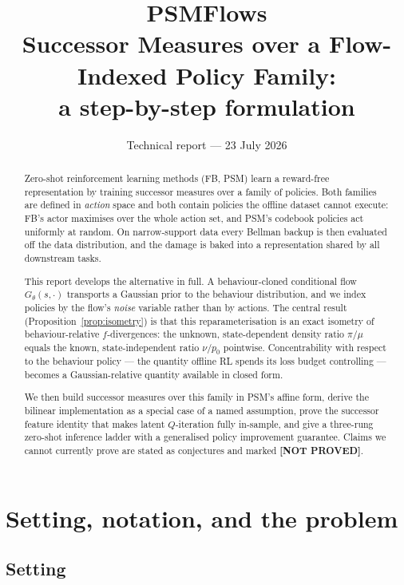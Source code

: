 \documentclass[11pt]{article}
\title{\textbf{PSMFlows}\\[0.3em]
\large Successor Measures over a Flow-Indexed Policy Family:\\
a step-by-step formulation}
\author{}
\date{Technical report --- 23 July 2026}
\theoremstyle{plain}
\theoremstyle{definition}
\theoremstyle{remark}
\newcommand{\1}{\mathbf 1}
\newcommand{\Gth}{G_\theta}
\newcommand{\NOTPROVED}{\textbf{\textup{[NOT PROVED]}}}
\begin{document}
\maketitle

\begin{abstract}
\noindent
Zero-shot reinforcement learning methods (FB, PSM) learn a reward-free representation by
training successor measures over a family of policies. Both families are defined in
\emph{action} space and both contain policies the offline dataset cannot execute: FB's
actor maximises over the whole action set, and PSM's codebook policies act uniformly at
random. On narrow-support data every Bellman backup is then evaluated off the data
distribution, and the damage is baked into a representation shared by all downstream
tasks.

This report develops the alternative in full. A behaviour-cloned conditional flow
$\Gth(s,\cdot)$ transports a Gaussian prior to the behaviour distribution, and we index
policies by the flow's \emph{noise} variable rather than by actions. The central result
(Proposition~\ref{prop:isometry}) is that this reparameterisation is an exact isometry of
behaviour-relative $f$-divergences: the unknown, state-dependent density ratio
$\pi/\mu$ equals the known, state-independent ratio $\nu/p_0$ pointwise. Concentrability
with respect to the behaviour policy --- the quantity offline RL spends its loss budget
controlling --- becomes a Gaussian-relative quantity available in closed form.

We then build successor measures over this family in PSM's affine form, derive the
bilinear implementation as a special case of a named assumption, prove the successor
feature identity that makes latent $Q$-iteration fully in-sample, and give a three-rung
zero-shot inference ladder with a generalised policy improvement guarantee. Claims we
cannot currently prove are stated as conjectures and marked \NOTPROVED.
\end{abstract}

\tableofcontents

\section{Setting, notation, and the problem}
\label{sec:setting}

\subsection{Setting}
\end{document}
